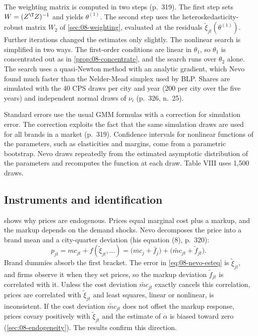The weighting matrix is computed in two steps (p.~319). The first step sets $W = (Z^{\T}Z)^{-1}$ and yields
$\theta^{(1)}$. The second step uses the heteroskedasticity-robust matrix $W_2$ of \cref{sec:08-weighting},
evaluated at the residuals $\tilde\xi_{jt}(\theta^{(1)})$. Further iterations changed the estimates only slightly. The nonlinear
search is simplified in two ways. The first-order conditions are linear in $\theta_1$, so $\theta_1$ is
concentrated out as in \cref{prop:08-concentrate}, and the search runs over $\theta_2$ alone. The search uses a
quasi-Newton method with an analytic gradient, which Nevo found much faster than the Nelder-Mead simplex used
by BLP. Shares are simulated with the 40 CPS draws per city and year (200 per city over the five years) and
independent normal draws of $\nu_i$ (p.~326, n.~25).

Standard errors use the usual GMM formulas \citep{Hansen1982} with a correction for simulation error. The
correction exploits the fact that the same simulation draws are used for all brands in a market (p.~319).
Confidence intervals for nonlinear functions of the parameters, such as elasticities and margins, come from a
parametric bootstrap. Nevo draws repeatedly from the estimated asymptotic distribution of the parameters and
recomputes the function at each draw. Table VIII uses 1,500 draws.

\subsection{Instruments and identification}\label{sec:08-nevo01-instruments}

 shows why prices are endogenous. Prices equal marginal cost plus a markup, and the markup depends
on the demand shocks. Nevo decomposes the price into a brand mean and a city-quarter deviation (his equation
(8), p.~320):
\begin{equation}\label{eq:08-nevo-price}
p_{jt} = mc_{jt} + f(\tilde\xi_{jt}, \dots)
= \big(\overline{mc}_j + \bar f_j\big) + \big(\widetilde{mc}_{jt} + \tilde f_{jt}\big).
\end{equation}
Brand dummies absorb the first bracket. The error in \cref{eq:08-nevo-esteq} is $\tilde\xi_{jt}$, and firms
observe it when they set prices, so the markup deviation $\tilde f_{jt}$ is correlated with it. Unless the cost
deviation $\widetilde{mc}_{jt}$ exactly cancels this correlation, prices are correlated with $\tilde\xi_{jt}$ and
least squares, linear or nonlinear, is inconsistent. If the cost deviation $\widetilde{mc}_{jt}$ does not offset the markup
response, prices covary positively with $\tilde\xi_{jt}$ and the estimate of $\alpha$ is biased toward zero
(\cref{sec:08-endogeneity}). The results confirm this direction.

